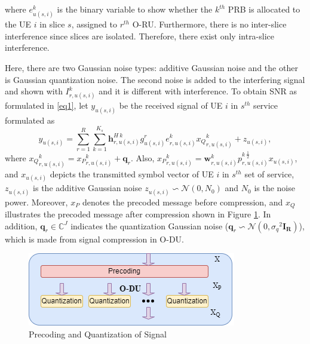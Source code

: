 \documentclass[lettersize,journal]{IEEEtran}
\begin{document}
where $e^{k}_{u(s,i)}$ is the binary variable to show whether the $k^{th}$ PRB is allocated to the UE $i$ in slice $s$, assigned to $r^{th}$ O-RU. %
Furthermore, there is no inter-slice interference since slices are isolated. Therefore, there exist only intra-slice interference.

Here, there are two Gaussian noise types: additive Gaussian noise and the other is Gaussian quantization noise. The second noise is added to the interfering signal and shown with $ I_{r,u(s,i)}^{k}$ and it is different with interference.
To obtain SNR as formulated in \eqref{eq1}, let $y_{u(s,i)} $ be the received signal of UE $i$ in $s^{th}$ service formulated as
\begin{equation}\label{eq2}
y_{u(s,i)} = \sum_{r = 1}^{R}\sum_{k=1}^{K_s} \boldsymbol{h}^{H \: k}_{r,u(s,i)} g_{u(s,i)}^r e^k_{r,u(s,i)}{x_Q}^k_{r,u(s,i)}+ z_{u(s,i)},
\end{equation}
where ${x_Q}^k_{r,u(s,i)} ={x_P}^k_{r,u(s,i)}+ \boldsymbol{q}_{r}$. Also, ${x_P}^k_{r,u(s,i)}= \boldsymbol{w}^k_{r,u(s,i)}{p^{k \: \frac{1}{2}}_{r,u(s,i)}} x_{u(s,i)} $, and  $ x_{u(s,i)}$ depicts the transmitted symbol vector of UE $i$ in $s^{th}$ set of service,  $z_{u(s,i)}$ is the additive Gaussian noise $z_{u(s,i)} \backsim \mathcal{N}(0,N_0)$ and $N_0$ is the noise power.
Moreover, ${x_P}$ denotes the precoded message before compression, and ${x_Q}$ illustrates the precoded message after compression shown in Figure \ref{fig:pq}.
In addition, $\boldsymbol{q}_{r} \in \mathbb{C}^{J }$ indicates the quantization Gaussian noise
($\boldsymbol{q}_{r} \backsim \mathcal{N}(0,{\sigma_q}^2\boldsymbol{I_{R}} )$), which is made from signal compression in O-DU.
\begin{figure}
  \centering
  \captionsetup{justification=centering}
    \includegraphics[scale = 0.45]{Qdiag.png}
  \caption{Precoding and Quantization of Signal}
  \label{fig:pq}
\end{figure}
\end{document}
